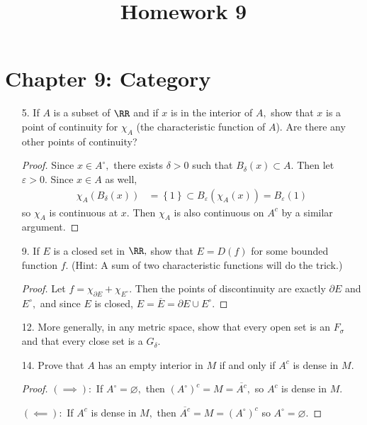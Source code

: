 \documentclass{article}
\begin{document}
\title{Homework 9}
\maketitle
\thispagestyle{fancy}

\section*{Chapter 9: Category}

\begin{itemize}
	\item[5.] If $A$ is a subset of $\RR$ and if $x$ is in the interior of $A,$ show that $x$ is a point of continuity for $\chi_A$ (the characteristic function of $A$). Are there any other points of continuity?
		\begin{proof}
			Since $x\in A^\circ,$ there exists $\delta>0$ such that $B_\delta(x)\subset A.$ Then let $\varepsilon>0.$ Since $x\in A$ as well, 
			\begin{align*}
				\chi_A\left( B_\delta(x) \right) &= \left\{ 1 \right\} \subset B_\varepsilon(\chi_A(x)) = B_\varepsilon(1)
			\end{align*}
			so $\chi_A$ is continuous at $x.$ Then $\chi_A$ is also continuous on $A^c$ by a similar argument.
		\end{proof}

	\item[9.] If $E$ is a closed set in $\RR,$ show that $E=D(f)$ for some bounded function $f.$ (Hint: A sum of two characteristic functions will do the trick.)
		\begin{proof}
			Let $f=\chi_{\partial E} + \chi_{E^\circ}.$ Then the points of discontinuity are exactly $\partial E$ and $E^\circ,$ and since $E$ is closed, $E=\overline{E}=\partial E \cup E^\circ.$
		\end{proof}

	\item[12.] More generally, in any metric space, show that every open set is an $F_\sigma$ and that every close set is a $G_\delta.$

	\item[14.] Prove that $A$ has an empty interior in $M$ if and only if $A^c$ is dense in $M.$
		\begin{proof}
			$(\implies):$ If $A^\circ=\varnothing,$ then $(A^\circ)^c=M=\overline{A^c},$ so $A^c$ is dense in $M.$

			$(\impliedby):$ If $A^c$ is dense in $M,$ then $\overline{A^c}=M=(A^\circ)^c$ so $A^\circ=\varnothing.$
		\end{proof}


\end{itemize}
\end{document}
